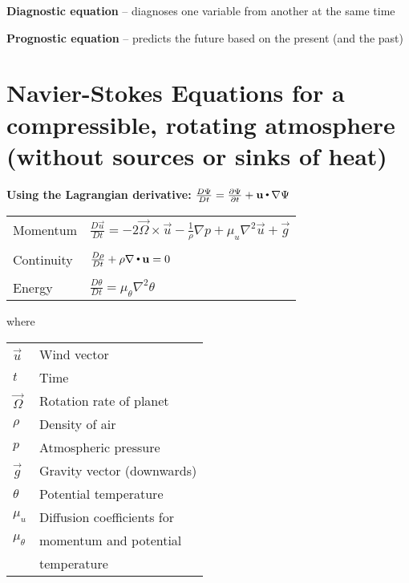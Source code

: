 
{\bf Diagnostic equation} -- diagnoses one variable from another at the same time

{\bf Prognostic equation} -- predicts the future based on the present (and the past)

\section{Navier-Stokes Equations for a compressible, rotating atmosphere
\normalfont\normalsize(without sources or sinks of heat)}

{\bf Using the Lagrangian derivative:}
$\frac{D\Psi}{Dt} = \frac{\partial\Psi}{\partial t} + \mathbf u\,{\scriptscriptstyle \stackrel{\bullet}{{}}}\,\nabla\Psi$

{\renewcommand{\arraystretch}{1.1}
\begin{tabular}{ll}
Momentum & $\frac{D\vec{u}}{Dt} = -2\vec{\Omega}\times\vec{u} - \frac{1}{\rho}\nabla p + \mu_u \nabla^2 \vec{u} + \vec{g}$ \\ \\
Continuity & $\frac{D\rho}{Dt} + \rho\nabla\,{\scriptscriptstyle \stackrel{\bullet}{{}}}\,\mathbf u = 0$\\ \\
Energy     & $\frac{D\theta}{Dt} = \mu_\theta \nabla^2 \theta$\\
\end{tabular}
\hspace{-0.1cm} where
\begin{tabular}{ll}
$\vec{u}$ & Wind vector \\
$t$       & Time \\
$\vec{\Omega}$ & Rotation rate of planet\\
$\rho$         & Density of air\\
$p$            & Atmospheric pressure\\
$\vec{g}$      & Gravity vector (downwards)\\
$\theta$       & Potential temperature\\
$\mu_u$        & Diffusion coefficients for \\
$\mu_\theta$   & momentum and potential \\
               & temperature\\
\end{tabular}}

